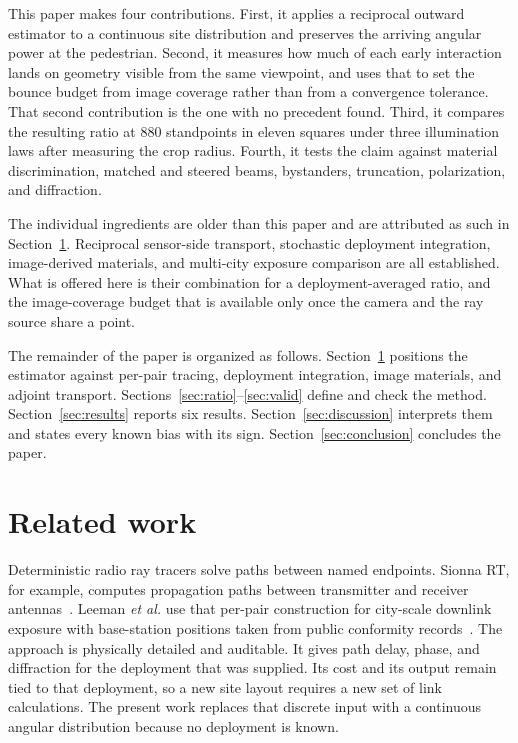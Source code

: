 \documentclass[journal]{IEEEtran}
\begin{document}
This paper makes four contributions. First, it applies a reciprocal outward
estimator to a continuous site distribution and preserves the arriving angular
power at the pedestrian. Second, it measures how much of each early interaction
lands on geometry visible from the same viewpoint, and uses that to set the
bounce budget from image coverage rather than from a convergence tolerance. That
second contribution is the one with no precedent found. Third, it compares the
resulting ratio at 880 standpoints in eleven squares under three illumination
laws after measuring the crop radius. Fourth, it tests the claim against material
discrimination, matched and steered beams, bystanders, truncation, polarization,
and diffraction.

The individual ingredients are older than this paper and are attributed as such
in Section~\ref{sec:related}. Reciprocal sensor-side transport, stochastic
deployment integration, image-derived materials, and multi-city exposure
comparison are all established. What is offered here is their combination for a
deployment-averaged ratio, and the image-coverage budget that is available only
once the camera and the ray source share a point.

The remainder of the paper is organized as follows. Section~\ref{sec:related}
positions the estimator against per-pair tracing, deployment integration, image
materials, and adjoint transport. Sections~\ref{sec:ratio}--\ref{sec:valid}
define and check the method. Section~\ref{sec:results} reports six
results. Section~\ref{sec:discussion} interprets them and states every known bias
with its sign. Section~\ref{sec:conclusion} concludes the paper.

\section{Related work}
\label{sec:related}

Deterministic radio ray tracers solve paths between named endpoints. Sionna RT,
for example, computes propagation paths between transmitter and receiver
antennas~\cite{sionna}. Leeman \emph{et al.} use that per-pair construction for
city-scale downlink exposure with base-station positions taken from public
conformity records~\cite{leeman}. The approach is physically detailed and
auditable. It gives path delay, phase, and diffraction for the deployment that
was supplied. Its cost and its output remain tied to that deployment, so a new
site layout requires a new set of link calculations. The present work replaces
that discrete input with a continuous angular distribution because no
deployment is known.
\end{document}
